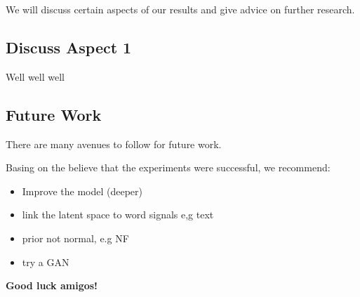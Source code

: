 We will discuss certain aspects of our results and give advice on further research.

\subsection{Discuss Aspect 1}

Well well well

\subsection{Future Work}

There are many avenues to follow for future work.

Basing on the believe that the experiments were successful, we recommend:

\begin{itemize}
    \item Improve the model (deeper)
    \item link the latent space to word signals e,g text
    \item prior not normal, e.g NF
    \item try a GAN
\end{itemize}

\textbf{Good luck amigos!}

